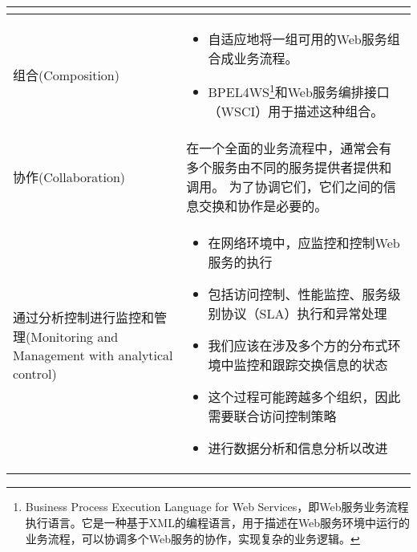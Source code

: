 \begin{longtable}{|m{2.5cm}<{\centering}|m{12cm}|}
\begin{itemize}[leftmargin=1.5em,itemsep=-2pt]
    \end{itemize} \\ \hline
    组合(Composition) & 
    \vspace{-1.3em}
    \begin{itemize}[leftmargin=1.5em,itemsep=-2pt]
        \item 自适应地将一组可用的Web服务组合成业务流程。
        \item BPEL4WS\footnote{Business Process Execution Language for Web Services，即Web服务业务流程执行语言。它是一种基于XML的编程语言，用于描述在Web服务环境中运行的业务流程，可以协调多个Web服务的协作，实现复杂的业务逻辑。}和Web服务编排接口（WSCI）用于描述这种组合。
    \vspace{-1.5em}
    \end{itemize} \\ \hline
    协作(Collaboration) & 在一个全面的业务流程中，通常会有多个服务由不同的服务提供者提供和调用。
    为了协调它们，它们之间的信息交换和协作是必要的。 \\ \hline
    通过分析控制进行监控和管理(Monitoring and Management with analytical control) & 
    \vspace{-1.3em}
    \begin{itemize}[leftmargin=1.5em,itemsep=-2pt]
        \item 在网络环境中，应监控和控制Web服务的执行
        \item 包括访问控制、性能监控、服务级别协议（SLA）执行和异常处理
        \item 我们应该在涉及多个方的分布式环境中监控和跟踪交换信息的状态
        \item 这个过程可能跨越多个组织，因此需要联合访问控制策略
        \item 进行数据分析和信息分析以改进
    \vspace{-1.5em}
    \end{itemize} \\ \hline
\end{longtable}